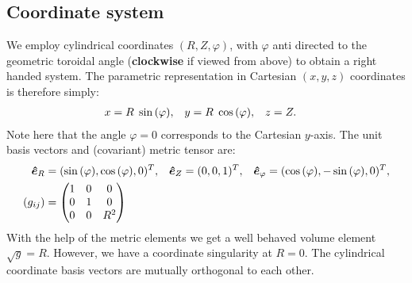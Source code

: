 \subsection{Coordinate system}\label{sec:cylmetric}
We employ cylindrical coordinates \( (R,Z,\varphi) \), with \(\varphi\) anti directed to the geometric toroidal angle ({\bf clockwise} if viewed from above) to
obtain a right handed system. The parametric representation in Cartesian \((x,y,z)\) coordinates is therefore simply:
\begin{align}
 x &= R \hspace{1 mm} \sin{(\varphi)}, &
 y &= R \hspace{1 mm} \cos{(\varphi)}, &
 z &= Z .
\end{align}
Note here that the angle $\varphi = 0$ corresponds to the Cartesian $y$-axis.
The unit
basis vectors and (covariant) metric tensor are:
\begin{align}
 \bm{\hat{e}}_R      &= (\sin{(\varphi)} ,   \cos{(\varphi)},0)^T, &
 \bm{\hat{e}}_Z      &= ( 0 ,0 ,1 )^T, &
 \bm{\hat{e}}_{\varphi} &= ( \cos{(\varphi)} , -\sin{(\varphi)} , 0 )^T,
\\
    (g_{ij}) &= \begin{pmatrix}
  1 & 0 & 0 \\
  0 & 1 & 0 \\
  0 & 0 & R^2
   \end{pmatrix}
\end{align}
With the help of the metric elements we get a well behaved volume element \(\sqrt{g} = R\). However, we have a coordinate singularity at \(R=0\).
The cylindrical coordinate basis vectors are mutually orthogonal to each other.

